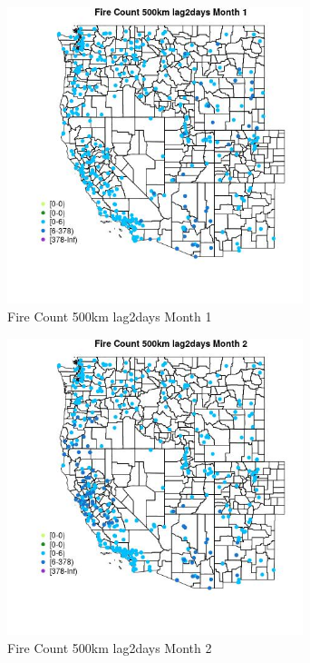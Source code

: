 \begin{figure} 
\centering  
\includegraphics[width=0.77\textwidth]{Code_Outputs/Report_ML_input_PM25_Step4_part_e_de_duplicated_aves_compiled_2019-05-18wNAs_MapObsMo1Fire_Count_500km_lag2days.jpg} 
\caption{\label{fig:Report_ML_input_PM25_Step4_part_e_de_duplicated_aves_compiled_2019-05-18wNAsMapObsMo1Fire_Count_500km_lag2days}Fire Count 500km lag2days Month 1} 
\end{figure} 
 

\begin{figure} 
\centering  
\includegraphics[width=0.77\textwidth]{Code_Outputs/Report_ML_input_PM25_Step4_part_e_de_duplicated_aves_compiled_2019-05-18wNAs_MapObsMo2Fire_Count_500km_lag2days.jpg} 
\caption{\label{fig:Report_ML_input_PM25_Step4_part_e_de_duplicated_aves_compiled_2019-05-18wNAsMapObsMo2Fire_Count_500km_lag2days}Fire Count 500km lag2days Month 2} 
\end{figure} 
 

